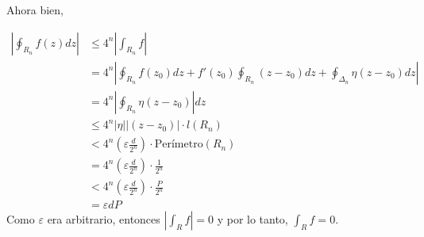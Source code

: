 \begin{dem}
        Ahora bien, 

        \begin{align*}
            \left|\oint_{R_n}f(z)dz\right|&\leq 4^n\left|\int_{R_n}f\right|\\
            &= 4^n\left|\oint_{R_n}f(z_0)dz+f'(z_0)\oint_{R_n}(z-z_0)dz+\oint_{\Delta_n}\eta(z-z_0)dz\right|\\
            &= 4^n\left|\oint_{R_n}\eta(z-z_0)\right|dz\\
            &\leq 4^n\left|\eta\right|\left|(z-z_0)\right|\cdot l(R_n)\\
            &< 4^n\left(\varepsilon\frac{d}{2^n}\right)\cdot \text{Perímetro}(R_n)\\
            &= 4^n\left(\varepsilon\frac{d}{2^n}\right)\cdot \frac{1}{2^n}\\
            &< 4^n\left(\varepsilon\frac{d}{2^n}\right)\cdot \frac{P}{2^n}\\
            &= \varepsilon dP 
        \end{align*}
        Como $\varepsilon$ era arbitrario, entonces $\left|\int_R f\right|=0$ y por lo tanto, $\int_R f =0$.
    
\end{dem}

%
%

